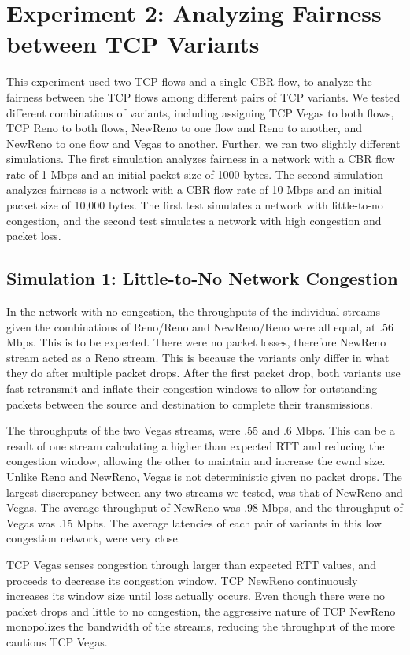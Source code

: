 \section{Experiment 2: Analyzing Fairness between TCP Variants}

This experiment used two TCP flows and a single CBR flow, to analyze the fairness between the TCP flows among different pairs of TCP variants. We tested different combinations of variants, including assigning TCP Vegas to both flows, TCP Reno to both flows, NewReno to one flow and Reno to another, and NewReno to one flow and Vegas to another. Further, we ran two slightly different simulations. The first simulation analyzes fairness in a network with a CBR flow rate of 1 Mbps and an initial packet size of 1000 bytes. The second simulation analyzes fairness is a network with a CBR flow rate of 10 Mbps and an initial packet size of 10,000 bytes. The first test simulates a network with little-to-no congestion, and the second test simulates a network with high congestion and packet loss.

\subsection{Simulation 1: Little-to-No Network Congestion}

In the network with no congestion, the throughputs of the individual streams given the combinations of Reno/Reno and NewReno/Reno were all equal, at .56 Mbps. This is to be expected. There were no packet losses, therefore NewReno stream acted as a Reno stream. This is because the variants only differ in what they do after multiple packet drops. After the first packet drop, both variants use fast retransmit and inflate their congestion windows to allow for outstanding packets between the source and destination to complete their transmissions. 

The throughputs of the two Vegas streams, were .55 and .6 Mbps. This can be a result of one stream calculating a higher than expected RTT and reducing the congestion window, allowing the other to maintain and increase the cwnd size. Unlike Reno and NewReno, Vegas is not deterministic given no packet drops. The largest discrepancy between any two streams we tested, was that of NewReno and Vegas. The average throughput of NewReno was .98 Mbps, and the throughput of Vegas was .15 Mpbs. The average latencies of each pair of variants in this low congestion network, were very close.

TCP Vegas senses congestion through larger than expected RTT values, and proceeds to decrease its congestion window. TCP NewReno continuously increases its window size until loss actually occurs. Even though there were no packet drops and little to no congestion, the aggressive nature of TCP NewReno monopolizes the bandwidth of the streams, reducing the throughput of the more cautious TCP Vegas.

